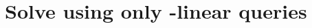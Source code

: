 \section{Solve \kSUM{} using only -linear queries}
\begin{frame}\frametitle{\insertsection}\justifying

\end{frame}
